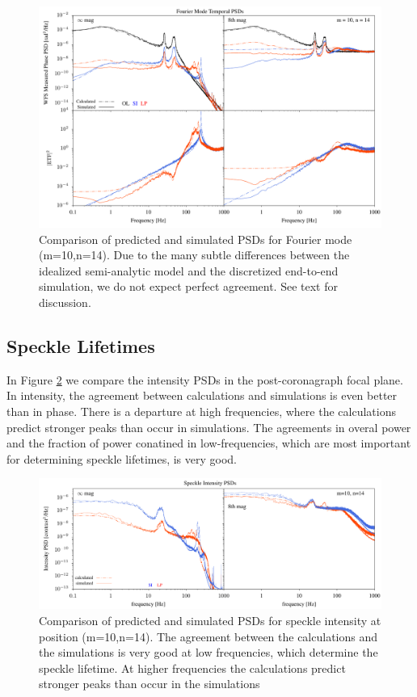 \documentclass[10pt,preprint]{aastex631}
\begin{document}
\begin{figure}
\hspace{-0.3in}
\includegraphics[width=6.5in]{psdcomp_10_14.pdf}
\caption{Comparison of predicted and simulated PSDs for Fourier mode (m=10,n=14).  Due to the many subtle differences between the idealized semi-analytic model and the discretized end-to-end simulation, we do not expect perfect agreement.  See text for discussion.    \label{fig:opd_psdcomp}}
\end{figure}


\subsection{Speckle Lifetimes}

In Figure \ref{fig:sppsdcomp} we compare the intensity PSDs in the post-coronagraph focal plane.  In intensity, the agreement between calculations and simulations is even better than in phase.  There is a departure at high frequencies, where the calculations predict stronger peaks than occur in simulations. The agreements in overal power and the fraction of power conatined in low-frequencies, which are most important for determining speckle lifetimes, is very good.

\begin{figure}
\hspace{-0.3in}
\includegraphics[width=6.5in]{spPsdComp_lp_10_14.pdf}
\caption{Comparison of predicted and simulated PSDs for speckle intensity at position (m=10,n=14).  The agreement between the calculations and the simulations is very good at low frequencies, which determine the speckle lifetime.  At higher frequencies the calculations predict stronger peaks than occur in the simulations  \label{fig:sppsdcomp}}
\end{figure}
\end{document}
